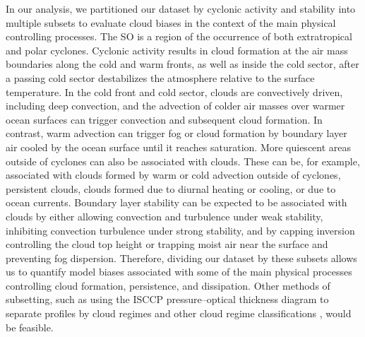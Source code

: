 \documentclass[draft]{agujournal2019}
\begin{document}
In our analysis, we partitioned our dataset by cyclonic activity and stability into multiple subsets to evaluate cloud biases in the context of the main physical controlling processes. The SO is a region of the occurrence of both extratropical and polar cyclones. Cyclonic activity results in cloud formation at the air mass boundaries along the cold and warm fronts, as well as inside the cold sector, after a passing cold sector destabilizes the atmosphere relative to the surface temperature. In the cold front and cold sector, clouds are convectively driven, including deep convection, and the advection of colder air masses over warmer ocean surfaces can trigger convection and subsequent cloud formation. In contrast, warm advection can trigger fog or cloud formation by boundary layer air cooled by the ocean surface until it reaches saturation. More quiescent areas outside of cyclones can also be associated with clouds. These can be, for example, associated with clouds formed by warm or cold advection outside of cyclones, persistent clouds, clouds formed due to diurnal heating or cooling, or due to ocean currents. Boundary layer stability can be expected to be associated with clouds by either allowing convection and turbulence under weak stability, inhibiting convection turbulence under strong stability, and by capping inversion controlling the cloud top height or trapping moist air near the surface and preventing fog dispersion. Therefore, dividing our dataset by these subsets allows us to quantify model biases associated with some of the main physical processes controlling cloud formation, persistence, and dissipation. Other methods of subsetting, such as using the ISCCP pressure--optical thickness diagram \cite{rossow1991,rossow1999,hahn2001} to separate profiles by cloud regimes and other cloud regime classifications \cite{oreopoulos2016,schuddeboom2018}, would be feasible.
\end{document}
